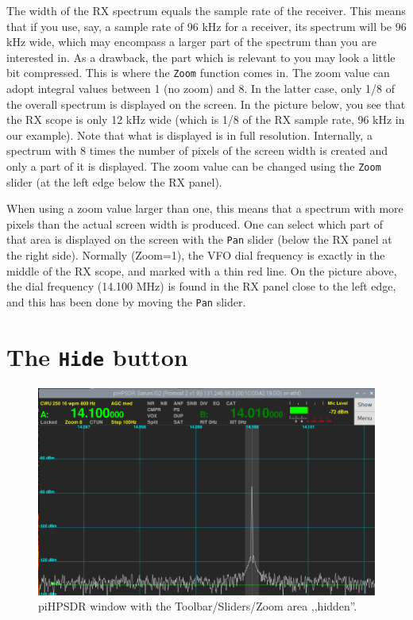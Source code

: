 \documentclass[12pt]{book}
\def\rett#1{\texttt{\color{red}#1}}
\begin{document}
The width of the RX spectrum equals the sample rate
of the receiver. This means that if you use, say,
a sample rate of 96 kHz for a receiver, its spectrum
will be 96 kHz wide, which may encompass a larger part
of the spectrum than you are interested in. As a drawback,
the part which is relevant to you may look a little bit
compressed. This is where the \rett{Zoom} function
comes in. The zoom value can adopt integral values between
1 (no zoom) and 8. In the latter case, only 1/8 of the
overall spectrum is displayed on the screen. In the
picture below, you see that the RX scope is only 12 kHz
wide (which is 1/8 of the RX sample rate, 96 kHz in our
example). Note that what is displayed is in full resolution.
Internally, a spectrum with 8 times the number of pixels
of the screen width is created and only a part of it is
displayed. The zoom value can be changed using the \rett{Zoom}
slider (at the left edge below the RX panel).


When using a zoom value larger than one, this means that
a spectrum with more pixels than the actual screen width
is produced. One can select which part of that area
is displayed on the screen with the \rett{Pan} slider
(below the RX panel at the right side). Normally (Zoom=1),
the VFO dial frequency is exactly in the middle of the
RX scope, and marked with a thin red line. On the picture
above, the dial frequency (14.100 MHz) is found in the RX
panel close to the left edge, and this has been done
by moving the \rett{Pan} slider.

\section{The \texttt{Hide} button}
\begin{figure}[h]
\center
\includegraphics[width=12cm]{Hidden.png}
\caption{piHPSDR window with the Toolbar/Sliders/Zoom
area ,,hidden''.}
\end{figure}
\end{document}
